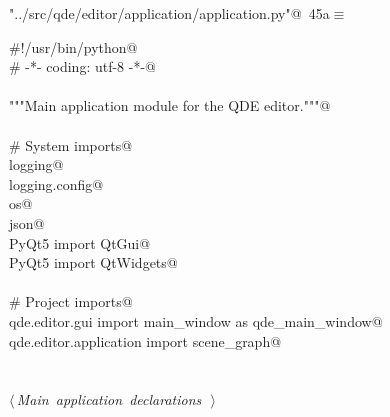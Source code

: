 \documentclass[
    a4paper,      %
    10pt,         %
    openright,    %
    notitlepage,  %
    parskip=half, %
]{scrreprt}       %
\theoremstyle{definition}                    %
\begin{document}
\begin{flushleft} \small
\begin{minipage}{\linewidth}\label{scrap51}\raggedright\small
{} \verb@"../src/qde/editor/application/application.py"@\nobreak\ {\footnotesize {45a}}$\equiv$
\vspace{-1ex}
\begin{list}{}{} \item
\mbox{}\lstinline@#!/usr/bin/python@\\
\mbox{}\lstinline@# -*- coding: utf-8 -*-@\\
\mbox{}\lstinline@@\\
\mbox{}\lstinline@"""Main application module for the QDE editor."""@\\
\mbox{}\lstinline@@\\
\mbox{}\lstinline@# System imports@\\
\mbox{}\lstinline@import logging@\\
\mbox{}\lstinline@import logging.config@\\
\mbox{}\lstinline@import os@\\
\mbox{}\lstinline@import json@\\
\mbox{}\lstinline@from PyQt5 import QtGui@\\
\mbox{}\lstinline@from PyQt5 import QtWidgets@\\
\mbox{}\lstinline@@\\
\mbox{}\lstinline@# Project imports@\\
\mbox{}\lstinline@from qde.editor.gui import main_window as qde_main_window@\\
\mbox{}\lstinline@from qde.editor.application import scene_graph@\\
\mbox{}\lstinline@@\\
\mbox{}\lstinline@@\\
\mbox{}\lstinline@@\hbox{$\langle\,${\itshape Main application declarations}\nobreak\ {\footnotesize {}}$\,\rangle$}\lstinline@@\\
\mbox{}\lstinline@@{\NWsep}
\end{list}
\vspace{-1.5ex}
\footnotesize
\begin{list}{}{\setlength{\itemsep}{-\parsep}\setlength{\itemindent}{-\leftmargin}}

\item{}
\end{list}
\end{minipage}\vspace{4ex}
\end{flushleft}
\end{document}
